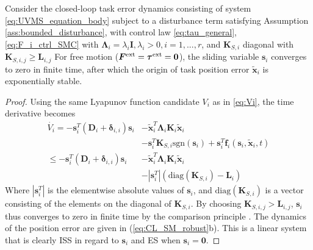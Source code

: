 \documentclass[../main.tex]{subfiles}
\begin{document}
\begin{theorem}
    \label{thm:robustness_SMC}
    Consider the closed-loop task error dynamics consisting of system \eqref{eq:UVMS_equation_body} subject to a disturbance term satisfying Assumption \ref{ass:bounded_disturbance}, with control law \eqref{eq:tau_general}, \eqref{eq:F_i_ctrl_SMC} with $\bm{\Lambda}_i=\lambda_i \bm{I}, \lambda_i > 0, i=1,...,r$, and $\bm{K}_{S,i}$ diagonal with $\bm{K}_{S,i,j} \geq \bm{L}_{i,j}$ For free motion ($\bm{F}^{\rm ext}=\bm{\tau}^{\rm ext} = \bm{0}$), the sliding variable $\bm{s}_i$ converges to zero in finite time, after which the origin of task position error $\tilde{\bm{x}}_i$ is exponentially stable.

\end{theorem}
\begin{proof}
Using the same Lyapunov function candidate $V_i$ as in \eqref{eq:Vi}, the time derivative becomes
\begin{align}
    \dot{V_i} = -\bm{s}_i^T (\bm{D}_i+ \bm{\delta}_{i,i}) \bm{s}_i
    &- \tilde{\bm{x}}_i ^T\bm{\Lambda}_i \bm{K}_i \tilde{\bm{x}}_i\\
    &- \bm{s}_i^T \bm{K}_{S,i} \text{sgn}(\bm{s}_i)
    + \bm{s}_i^T \bm{f}_i(\bm{s}_i,\tilde{\bm{x}}_i,t)  \nonumber \\
    \leq -\bm{s}_i^T (\bm{D}_i+ \bm{\delta}_{i,i}) \bm{s}_i
    &- \tilde{\bm{x}}_i ^T\bm{\Lambda}_i \bm{K}_i \tilde{\bm{x}}_i \\
    &- |\bm{s}_i^T| (\text{diag}(\bm{K}_{S,i}) - \bm{L}_i) \nonumber
\end{align}
Where $|\bm{s}_i^T|$ is the elementwise absolute values of $\bm{s}_i$, and $\text{diag}(\bm{K}_{S,i})$ is a vector consisting of the elements on the diagonal of $\bm{K}_{S,i}$. By choosing $\bm{K}_{S,i,j} > \bm{L}_{i,j}$, $\bm{s}_i$  thus converges to zero in finite time by the comparison principle \cite{Khalil2002}. The dynamics of the position error are given in (\ref{eq:CL_SM_robust}b). This is a linear system that is clearly ISS in regard to $\bm{s}_i$ and ES when $\bm{s}_i = \bm{0}$.


\end{proof}
\end{document}
